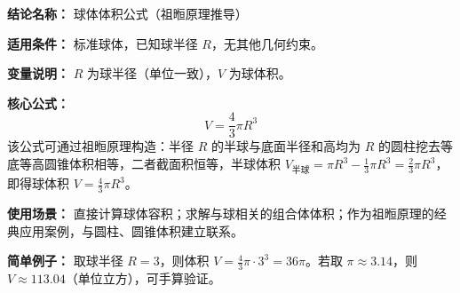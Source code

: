 \textbf{结论名称：} 球体体积公式（祖暅原理推导）

\textbf{适用条件：} 标准球体，已知球半径 $R$，无其他几何约束。

\textbf{变量说明：} $R$ 为球半径（单位一致），$V$ 为球体积。

\textbf{核心公式：} \[ \boxed{V = \frac{4}{3}\pi R^3} \] 该公式可通过祖暅原理构造：半径 $R$ 的半球与底面半径和高均为 $R$ 的圆柱挖去等底等高圆锥体积相等，二者截面积恒等，半球体积 $V_{\text{半球}} = \pi R^3 - \frac{1}{3}\pi R^3 = \frac{2}{3}\pi R^3$，即得球体积 $V = \frac{4}{3}\pi R^3$。

\textbf{使用场景：} 直接计算球体容积；求解与球相关的组合体体积；作为祖暅原理的经典应用案例，与圆柱、圆锥体积建立联系。

\textbf{简单例子：} 取球半径 $R = 3$，则体积 $V = \frac{4}{3}\pi \cdot 3^3 = 36\pi$。若取 $\pi \approx 3.14$，则 $V \approx 113.04$（单位立方），可手算验证。